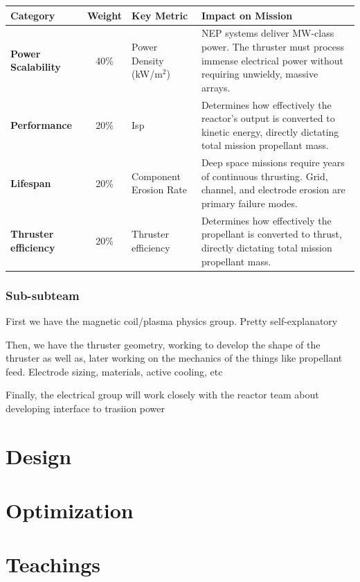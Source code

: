 \vspace{1.5em}

\noindent
\begin{tabularx}{\textwidth}{@{} l c l X @{}}
\toprule
\textbf{Category} & \textbf{Weight} & \textbf{Key Metric} & \textbf{Impact on Mission} \\
\midrule
\textbf{Power Scalability} & 40\% & Power Density (kW/m$^2$) & NEP systems deliver MW-class power. The thruster must process immense electrical power without requiring unwieldy, massive arrays. \\
\addlinespace
\textbf{Performance} & 20\% & Isp & Determines how effectively the reactor's output is converted to kinetic energy, directly dictating total mission propellant mass. \\
\addlinespace
\textbf{Lifespan} & 20\% & Component Erosion Rate & Deep space missions require years of continuous thrusting. Grid, channel, and electrode erosion are primary failure modes. \\
\addlinespace
\textbf{Thruster efficiency} & 20\% &  Thruster efficiency & Determines how effectively the propellant is converted to thrust, directly dictating total mission propellant mass. \\
\bottomrule
\end{tabularx}

\subsubsection{Sub-subteam}
First we have the magnetic coil/plasma physics group. Pretty self-explanatory

Then, we have the thruster geometry, working to develop the shape of the thruster as well as, later working on the mechanics of the things like propellant feed. Electrode sizing, materials, active cooling, etc

Finally, the electrical group will work closely with the reactor team about developing interface to trasiion power
\section{Design}


\section{Optimization}



\section{Teachings}

